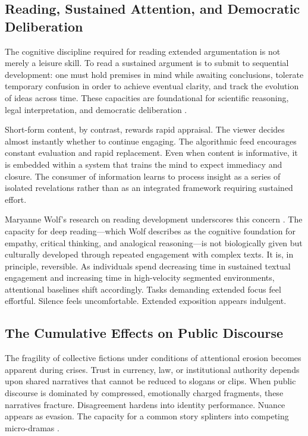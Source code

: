\documentclass[11pt]{article}
\begin{document}
\subsection{Reading, Sustained Attention, and Democratic Deliberation}

The cognitive discipline required for reading extended argumentation is not merely a leisure skill. To read a sustained argument is to submit to sequential development: one must hold premises in mind while awaiting conclusions, tolerate temporary confusion in order to achieve eventual clarity, and track the evolution of ideas across time. These capacities are foundational for scientific reasoning, legal interpretation, and democratic deliberation \citep{Postman1985, Carr2010}.

Short-form content, by contrast, rewards rapid appraisal. The viewer decides almost instantly whether to continue engaging. The algorithmic feed encourages constant evaluation and rapid replacement. Even when content is informative, it is embedded within a system that trains the mind to expect immediacy and closure. The consumer of information learns to process insight as a series of isolated revelations rather than as an integrated framework requiring sustained effort.

Maryanne Wolf's research on reading development underscores this concern \citep{Wolf2018}. The capacity for deep reading---which Wolf describes as the cognitive foundation for empathy, critical thinking, and analogical reasoning---is not biologically given but culturally developed through repeated engagement with complex texts. It is, in principle, reversible. As individuals spend decreasing time in sustained textual engagement and increasing time in high-velocity segmented environments, attentional baselines shift accordingly. Tasks demanding extended focus feel effortful. Silence feels uncomfortable. Extended exposition appears indulgent.

\subsection{The Cumulative Effects on Public Discourse}

The fragility of collective fictions under conditions of attentional erosion becomes apparent during crises. Trust in currency, law, or institutional authority depends upon shared narratives that cannot be reduced to slogans or clips. When public discourse is dominated by compressed, emotionally charged fragments, these narratives fracture. Disagreement hardens into identity performance. Nuance appears as evasion. The capacity for a common story splinters into competing micro-dramas \citep{Lanier2018}.
\end{document}
